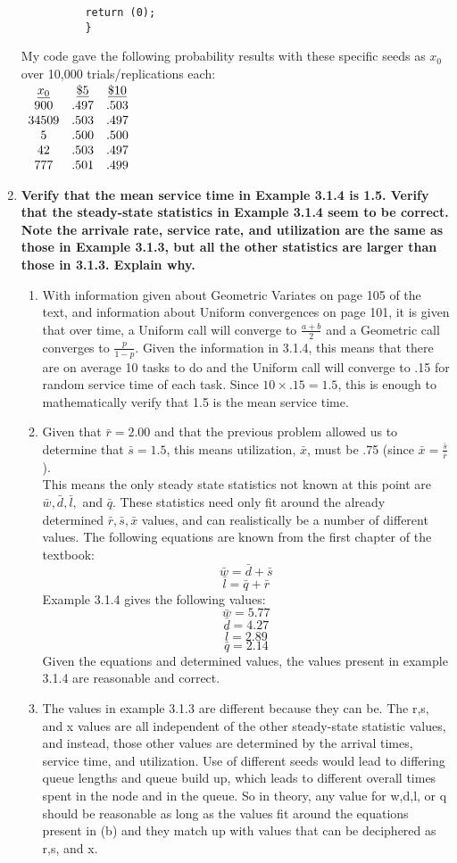 \documentclass[11pt]{article}
\begin{document}
\begin{enumerate}
\begin{verbatim}
		  return (0);
		  }
		\end{verbatim} 
		My code gave the following probability results with these specific seeds as $x_0$ over 10,000 trials/replications each:\\
		$\begin{array}{c c c}
			\underline{x_0}&\underline{\$5}&\underline{\$10}\cr
			900&.497&.503\cr
			34509&.503&.497\cr
			5&.500&.500\cr
			42&.503&.497\cr
			777&.501&.499
		\end{array}$
\item \textbf{Verify that the mean service time in Example 3.1.4 is 1.5. Verify that the steady-state statistics in Example 3.1.4 seem to be correct. Note the arrivale rate, service rate, and utilization are the same as those in Example 3.1.3, but all the other statistics are larger than those in 3.1.3. Explain why.}
	\begin{enumerate}
		\item With information given about Geometric Variates on page 105 of the text, and information about Uniform convergences on page 101, it is given that over time, a Uniform call will converge to $\frac{a+b}{2}$ and a Geometric call converges to $\frac{p}{1-p}$. Given the information in 3.1.4, this means that there are on average 10 tasks to do and the Uniform call will converge to .15 for random service time of each task. Since $10\times.15 = 1.5$,  this is enough to mathematically verify that 1.5 is the mean service time.
		\item Given that $\bar{r} = 2.00$ and that the previous problem allowed us to determine that $ \bar{s} = 1.5$, this means utilization, $\bar{x}$, must be .75 (since $\bar{x} = \frac{\bar{s}}{\bar{r}}$).
		\\This means the only steady state statistics not known at this point are $\bar{w},\bar{d}, \bar{l},$ and $\bar{q}$. These statistics need only fit around the already determined $\bar{r},\bar{s},\bar{x}$ values, and can realistically be a number of different values.
		The following equations are known from the first chapter of the textbook:
		$$\bar{w} = \bar{d} + \bar{s}$$
		$$\bar{l} = \bar{q} + \bar{r}$$
		Example 3.1.4 gives the following values:
		$$\bar{w} = 5.77$$
		$$\bar{d} = 4.27$$
		$$\bar{l} = 2.89$$
		$$\bar{q} = 2.14$$
		Given the equations and determined values, the values present in example 3.1.4 are reasonable and correct.
		\item The values in example 3.1.3 are different because they can be. The r,s, and x values are all independent of the other steady-state statistic values, and instead, those other values are determined by the arrival times, service time, and utilization. Use of different seeds would lead to differing queue lengths and queue build up, which leads to different overall times spent in the node and in the queue. So in theory, any value for w,d,l, or q should be reasonable as long as the values fit around the equations present in (b) and they match up with values that can be deciphered as r,s, and x.
		
	\end{enumerate}
\end{enumerate}
\end{document}

